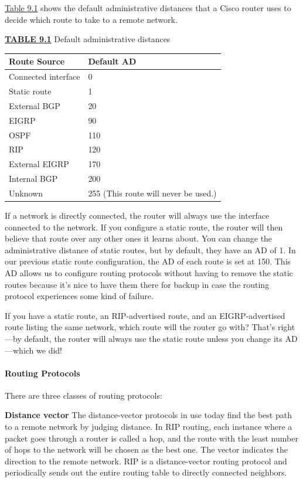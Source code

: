 \protect\hyperlink{c09.xhtmlux5cux23table9-1}{Table 9.1} shows the
default administrative distances that a Cisco router uses to decide
which route to take to a remote network.

{\protect\hyperlink{c09.xhtmlux5cux23tableanchor9-1}{\textbf{TABLE 9.1}}
Default administrative distances}

\begin{longtable}[]{@{}ll@{}}
\toprule
Route Source & Default AD\tabularnewline
\midrule
\endhead
Connected interface & 0\tabularnewline
Static route & 1\tabularnewline
External BGP & 20\tabularnewline
EIGRP & 90\tabularnewline
OSPF & 110\tabularnewline
RIP & 120\tabularnewline
External EIGRP & 170\tabularnewline
Internal BGP & 200\tabularnewline
Unknown & 255 (This route will never be used.)\tabularnewline
\bottomrule
\end{longtable}

If a network is directly connected, the router will always use the
interface connected to the network. If you configure a static route, the
router will then believe that route over any other ones it learns about.
You can change the administrative distance of static routes, but by
default, they have an AD of 1. In our previous static route
configuration, the AD of each route is set at 150. This AD allows us to
configure routing protocols without having to remove the static routes
because it's nice to have them there for backup in case the routing
protocol experiences some kind of failure.

\protect\hypertarget{c09.xhtmlux5cux23Page_392}{}{}If you have a static
route, an RIP-advertised route, and an EIGRP-advertised route listing
the same network, which route will the router go with? That's right---by
default, the router will always use the static route unless you change
its AD---which we did!

\paragraph{Routing Protocols}

There are three classes of routing protocols:

\textbf{Distance vector} The distance-vector protocols in use today find
the best path to a remote network by judging distance. In RIP routing,
each instance where a packet goes through a router is called a hop, and
the route with the least number of hops to the network will be chosen as
the best one. The vector indicates the direction to the remote network.
RIP is a distance-vector routing protocol and periodically sends out the
entire routing table to directly connected neighbors.


